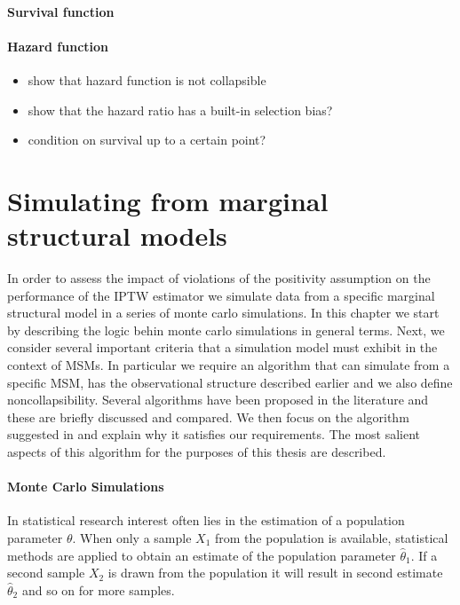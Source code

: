 \documentclass[11pt]{article}
\providecommand{\tightlist}{%
      \setlength{\itemsep}{0pt}\setlength{\parskip}{0pt}}
\begin{document}
\paragraph{Survival function}\label{survival-function}

\paragraph{Hazard function}\label{hazard-function}

\begin{itemize}
\tightlist
\item
  show that hazard function is not collapsible
\item
  show that the hazard ratio has a built-in selection bias?
\item
  condition on survival up to a certain point?
\end{itemize}

    \newpage

    \section{Simulating from marginal structural
models}\label{simulating-from-marginal-structural-models}

In order to assess the impact of violations of the positivity assumption
on the performance of the IPTW estimator we simulate data from a
specific marginal structural model in a series of monte carlo
simulations. In this chapter we start by describing the logic behin
monte carlo simulations in general terms. Next, we consider several
important criteria that a simulation model must exhibit in the context
of MSMs. In particular we require an algorithm that can simulate from a
specific MSM, has the observational structure described earlier and we
also define noncollapsibility. Several algorithms have been proposed in
the literature and these are briefly discussed and compared. We then
focus on the algorithm suggested in \citet{Havercroft2010} and explain
why it satisfies our requirements. The most salient aspects of this
algorithm for the purposes of this thesis are described.

\paragraph{Monte Carlo Simulations}\label{monte-carlo-simulations}

In statistical research interest often lies in the estimation of a
population parameter \(\theta\). When only a sample \(X_1\) from the
population is available, statistical methods are applied to obtain an
estimate of the population parameter \(\hat \theta_1\). If a second
sample \(X_2\) is drawn from the population it will result in second
estimate \(\hat \theta_2\) and so on for more samples.
\end{document}
